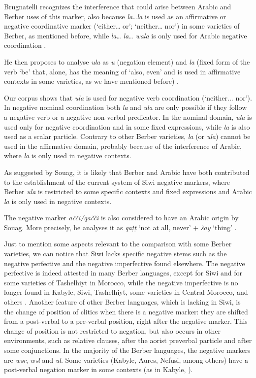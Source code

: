 \documentclass[output=paper,colorlinks,citecolor=brown]{langscibook}
\begin{document}
Brugnatelli recognizes the interference that could arise between Arabic and Berber uses of this marker, also because \textit{la}…\textit{la} is used as an affirmative or negative coordinative marker (‘either… or’; ‘neither… nor’) in some varieties of Berber, as mentioned before, while \textit{la}… \textit{la}… \textit{wala} is only used for Arabic negative coordination \citep[403]{Brugnatelli2010}. 

He then proposes to analyse \textit{ula} as \textit{u} (negation element) and \textit{la} (fixed form of the verb ‘be’ that, alone, has the meaning of ‘also, even’ and is used in affirmative contexts in some varieties, as we have mentioned before) \citep[404]{Brugnatelli2010}.

Our corpus shows that \textit{ula} is used for negative verb coordination (‘neither... nor’). In negative nominal coordination both \textit{la} and \textit{ula} are only possible if they follow a negative verb or a negative non-verbal predicator. In the nominal domain, \textit{ula} is used only for negative coordination and in some fixed expressions, while \textit{la} is also used as a scalar particle. Contrary to other Berber varieties, \textit{la} (or \textit{ula}) cannot be used in the affirmative domain, probably because of the interference of Arabic, where \textit{la} is only used in negative contexts.

As suggested by Souag, it is likely that Berber and Arabic have both contributed to the establishment of the current system of Siwi negative markers, where Berber \textit{ula} is restricted to some specific contexts and fixed expressions and Arabic \textit{la} is only used in negative contexts.

The negative marker \textit{ačči/qačči} is also considered to have an Arabic origin by Souag. More precisely, he analyses it as \textit{qaṭṭ} ‘not at all, never’ + \textit{šay} ‘thing’ \citep{Souag2009}.

Just to mention some aspects relevant to the comparison with some Berber varieties, we can notice that Siwi lacks specific negative stems such as the negative perfective and the negative imperfective found elsewhere. The negative perfective is indeed attested in many Berber languages, except for Siwi and for some varieties of Tashelhiyt in Morocco, while the negative imperfective is no longer found in Kabyle, Siwi, Tashelhiyt, some varieties in Central Morocco, and others \citep[41]{Kossmann2012}. Another feature of other Berber languages, which is lacking in Siwi, is the change of position of clitics when there is a negative marker: they are shifted from a post-verbal to a pre-verbal position, right after the negative marker. This change of position is not restricted to negation, but also occurs in other environments, such as relative clauses, after the aorist preverbal particle and after some conjunctions.
In the majority of the Berber languages, the negative markers are \textit{wər}, \textit{wəl} and \textit{ul}. Some varieties (Kabyle, Aures, Nefusi, among others) have a post-verbal negation marker in some contexts (as in Kabyle, \citealt{Mettouchi2009,Mettouchi2021}).
\end{document}
